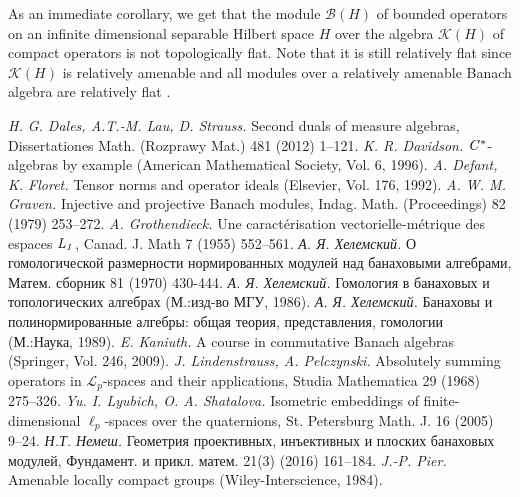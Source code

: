 \documentclass[12pt]{article}
\begin{document}
As an immediate corollary, we get that the module $\mathcal{B}(H)$ of bounded operators on an infinite dimensional separable Hilbert space $H$ over the algebra $\mathcal{K}(H)$ of compact operators is not topologically flat. Note that it is still relatively flat since $\mathcal{K}(H)$ is relatively amenable \cite[VII.1.89]{HelBanLocConvAlg} and all modules over a relatively amenable Banach algebra are relatively flat \cite[VII.1.60(I)]{HelBanLocConvAlg}.


\begin{thebibliography}{999}

\textit{H. G. Dales, A.T.-M. Lau, D. Strauss.} Second duals of measure algebras, Dissertationes Math. (Rozprawy Mat.) 481 (2012) 1--121.
%
\textit{K. R. Davidson.} $\it{C^*}$-algebras by example (American Mathematical Society, Vol. 6, 1996).
%
\textit{A. Defant, K. Floret.} Tensor norms and operator ideals (Elsevier, Vol. 176, 1992).
%
\textit{A. W. M. Graven.} Injective and projective Banach modules, Indag. Math. (Proceedings) 82 (1979) 253--272.
%
\textit{A. Grothendieck.} Une caract{\'e}risation vectorielle-m{\'e}trique des espaces $\it{L}_1$, Canad. J. Math 7 (1955) 552--561.
%
\textit{А. Я. Хелемский.} О гомологической размерности нормированных модулей над банаховыми алгебрами, Матем. сборник 81 (1970) 430-444.
%
\textit{А. Я. Хелемский.} Гомология в банаховых и топологических алгебрах (М.:изд-во МГУ, 1986).
%
\textit{А. Я. Хелемский.} Банаховы и полинормированные алгебры: общая теория, представления, гомологии (М.:Наука, 1989).
%
\textit{E. Kaniuth.} A course in commutative Banach algebras (Springer, Vol. 246, 2009).
%
\textit{J. Lindenstrauss, A. Pelczynski.} Absolutely summing operators in $\mathcal{L}_p$-spaces and their applications, Studia Mathematica 29 (1968) 275--326.
%
\textit{Yu. I. Lyubich, O. A. Shatalova.} Isometric embeddings of finite-dimensional $\ell_p$-spaces over the quaternions, St. Petersburg Math. J. 16 (2005) 9--24.
%
\textit{Н.Т. Немеш.} Геометрия проективных, инъективных и плоских банаховых модулей, Фундамент. и прикл. матем. 21(3) (2016) 161--184.
%
\textit{J.-P. Pier.} Amenable locally compact groups (Wiley-Interscience, 1984).
%

\end{thebibliography}
\end{document}
